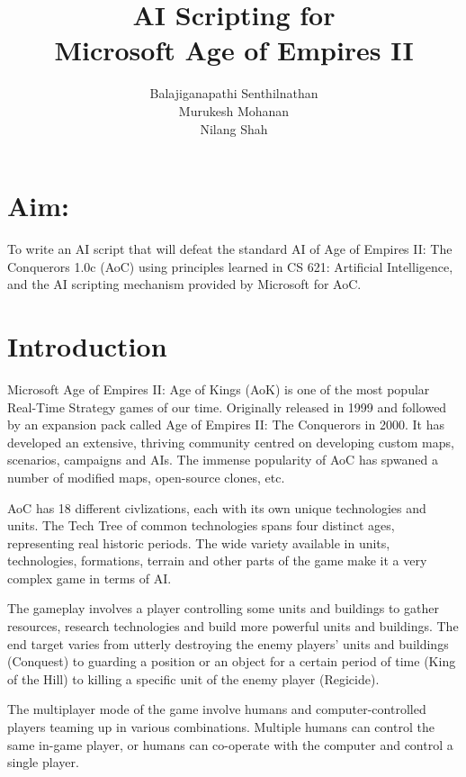 \documentclass[a4paper,12pt]{article}
\title{AI Scripting for \\Microsoft{\small \texttrademark} Age of Empires II{\small \texttrademark}}
\author{Balajiganapathi Senthilnathan\\Murukesh Mohanan\\Nilang Shah}
\begin{document}
\maketitle
\thispagestyle{empty}              %
\section*{Aim:}
To write an AI script that will defeat the standard AI of Age of Empires II: The Conquerors 1.0c (AoC) 
using principles learned in CS 621: Artificial Intelligence, and the AI scripting mechanism provided by 
Microsoft for AoC.
\section*{Introduction}
Microsoft{\small \texttrademark} Age of Empires II: Age of Kings{\small \texttrademark} (AoK) is 
one of the most popular Real-Time Strategy games of our time. Originally released in 1999 and followed
by an expansion pack called Age of Empires II: The Conquerors{\small \texttrademark}
in 2000. It has developed an extensive, thriving community centred on developing custom maps, 
scenarios, campaigns and AIs. The immense popularity of AoC has spwaned a number of modified maps, 
open-source clones, etc.

AoC has 18 different civlizations, each with its own unique technologies and units. The Tech Tree of 
common technologies spans four distinct ages, representing real historic periods.  The wide variety 
available in units, technologies, formations, terrain and other parts of the game make it a very complex 
game in terms of AI.

The gameplay involves a player controlling some units and buildings to gather resources, research 
technologies and build more powerful units and buildings. The end target varies from utterly destroying
the enemy players' units and buildings (Conquest) to guarding a position or an object for a certain 
period of time (King of the Hill) to killing a specific unit of the enemy player (Regicide). 

The multiplayer mode of the game involve humans and computer-controlled players teaming up in various
combinations. Multiple humans can control the same in-game player, or humans can co-operate with
the computer and control a single player.
\end{document}
